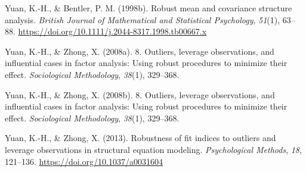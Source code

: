 \documentclass[
  man]{apa7}
\newlength{\cslhangindent}
\newenvironment{CSLReferences}[2] %
 {\begin{list}{}{%
  \setlength{\itemindent}{0pt}
  \setlength{\leftmargin}{0pt}
  \setlength{\parsep}{0pt}
  \ifodd #1
   \setlength{\leftmargin}{\cslhangindent}
   \setlength{\itemindent}{-1\cslhangindent}
  \fi
  \setlength{\itemsep}{#2\baselineskip}}}
 {\end{list}}
\begin{document}
\begin{CSLReferences}{1}{0}
Yuan, K.-H., \& Bentler, P. M. (1998b). Robust mean and covariance structure analysis. \emph{British Journal of Mathematical and Statistical Psychology}, \emph{51}(1), 63--88. \url{https://doi.org/10.1111/j.2044-8317.1998.tb00667.x}

Yuan, K.-H., \& Zhong, X. (2008a). 8. Outliers, leverage observations, and influential cases in factor analysis: Using robust procedures to minimize their effect. \emph{Sociological Methodology}, \emph{38}(1), 329--368.

Yuan, K.-H., \& Zhong, X. (2008b). 8. Outliers, leverage observations, and influential cases in factor analysis: Using robust procedures to minimize their effect. \emph{Sociological Methodology}, \emph{38}(1), 329--368.

Yuan, K.-H., \& Zhong, X. (2013). Robustness of fit indices to outliers and leverage observations in structural equation modeling. \emph{Psychological Methods}, \emph{18}, 121--136. \url{https://doi.org/10.1037/a0031604}

\end{CSLReferences}

\setlength{\parindent}{-0.5in}
\setlength{\leftskip}{0.5in}
\end{document}
